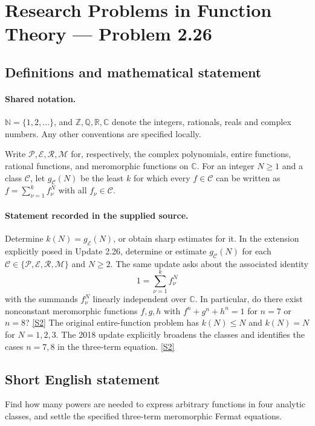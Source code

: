 \documentclass[11pt]{article}
\newcommand{\sref}[2]{\hyperlink{source:#1:#2}{[S#2]}}
\begin{document}
\section{Research Problems in Function Theory — Problem 2.26}\label{statement}

\subsection{Definitions and mathematical statement}

\paragraph{Shared notation.}$\mathbb N=\{1,2,\ldots\}$, and $\mathbb Z,\mathbb Q,\mathbb R,\mathbb C$ denote the integers, rationals, reals and complex numbers. Any other conventions are specified locally.


Write $\mathcal P,\mathcal E,\mathcal R,\mathcal M$ for, respectively, the complex polynomials, entire functions, rational functions, and meromorphic functions on $\mathbb C$. For an integer $N\ge1$ and a class $\mathcal C$, let $g_{\mathcal C}(N)$ be the least $k$ for which every $f\in\mathcal C$ can be written as $f=\sum_{\nu=1}^k f_\nu^N$ with all $f_\nu\in\mathcal C$.

\paragraph{Statement recorded in the supplied source.}
Determine $k(N)=g_{\mathcal E}(N)$, or obtain sharp estimates for it. In the extension explicitly posed in Update 2.26, determine or estimate $g_{\mathcal C}(N)$ for each $\mathcal C\in\{\mathcal P,\mathcal E,\mathcal R,\mathcal M\}$ and $N\ge2$.
The same update asks about the associated identity
\[1=\sum_{\nu=1}^k f_\nu^N\]
with the summands $f_\nu^N$ linearly independent over $\mathbb C$. In particular, do there exist nonconstant meromorphic functions $f,g,h$ with $f^n+g^n+h^n=1$ for $n=7$ or $n=8$? \sref{statement}{2}
The original entire-function problem has $k(N)\le N$ and $k(N)=N$ for $N=1,2,3$. The 2018 update explicitly broadens the classes and identifies the cases $n=7,8$ in the three-term equation. \sref{statement}{2}
\subsection{Short English statement}
Find how many powers are needed to express arbitrary functions in four analytic classes, and settle the specified three-term meromorphic Fermat equations.
\end{document}
